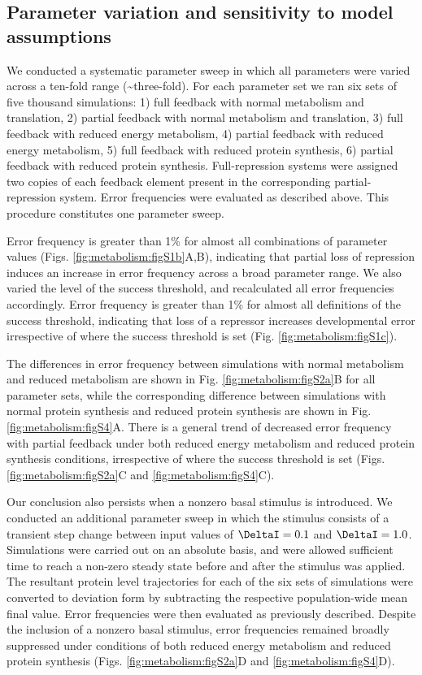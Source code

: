 \subsection{Parameter variation and sensitivity to model assumptions}
\label{appendix:methods:metabolism:sweeps}

We conducted a systematic parameter sweep in which all parameters were varied across a ten-fold range (\pm \textasciitilde{}three-fold). For each parameter set we ran six sets of five thousand simulations: 1) full feedback with normal metabolism and translation, 2) partial feedback with normal metabolism and translation, 3) full feedback with reduced energy metabolism, 4) partial feedback with reduced energy metabolism, 5) full feedback with reduced protein synthesis, 6) partial feedback with reduced protein synthesis. Full-repression systems were assigned two copies of each feedback element present in the corresponding partial-repression system. Error frequencies were evaluated as described above. This procedure constitutes one parameter sweep.

Error frequency is greater than 1\% for almost all combinations of parameter values (Figs. \ref{fig:metabolism:figS1b}A,B), indicating that partial loss of repression induces an increase in error frequency across a broad parameter range. We also varied the level of the success threshold, and recalculated all error frequencies accordingly. Error frequency is greater than 1\% for almost all definitions of the success threshold, indicating that loss of a repressor increases developmental error irrespective of where the success threshold is set (Fig. \ref{fig:metabolism:figS1c}).

The differences in error frequency between simulations with normal metabolism and reduced metabolism are shown in Fig. \ref{fig:metabolism:figS2a}B for all parameter sets, while the corresponding difference between simulations with normal protein synthesis and reduced protein synthesis are shown in Fig. \ref{fig:metabolism:figS4}A. There is a general trend of decreased error frequency with partial feedback under both reduced energy metabolism and reduced protein synthesis conditions, irrespective of where the success threshold is set (Figs. \ref{fig:metabolism:figS2a}C and \ref{fig:metabolism:figS4}C).

Our conclusion also persists when a nonzero basal stimulus is introduced. We conducted an additional parameter sweep in which the stimulus consists of a transient step change between input values of $\DeltaI=0.1$ and $\DeltaI=1.0$. Simulations were carried out on an absolute basis, and were allowed sufficient time to reach a non-zero steady state before and after the stimulus was applied. The resultant protein level trajectories for each of the six sets of simulations were converted to deviation form by subtracting the respective population-wide mean final value. Error frequencies were then evaluated as previously described. Despite the inclusion of a nonzero basal stimulus, error frequencies remained broadly suppressed under conditions of both reduced energy metabolism and reduced protein synthesis (Figs. \ref{fig:metabolism:figS2a}D and \ref{fig:metabolism:figS4}D).

